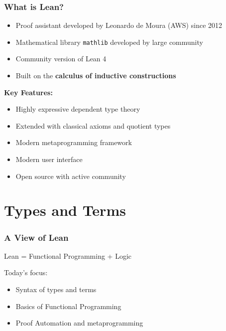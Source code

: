 \documentclass{beamer}
\begin{document}
\begin{frame}
  \frametitle{What is Lean?}
  
  \begin{itemize}
    \item Proof assistant developed by Leonardo de Moura (AWS) since 2012
    \item Mathematical library \texttt{mathlib} developed by large community
    \item Community version of Lean 4
    \item Built on the \textbf{calculus of inductive constructions}
  \end{itemize}
  
  \vspace{0.3cm}
  
  \textbf{Key Features:}
  \begin{itemize}
    \item Highly expressive dependent type theory
    \item Extended with classical axioms and quotient types
    \item Modern metaprogramming framework
    \item Modern user interface
    \item Open source with active community
  \end{itemize}
\end{frame}


\section{Types and Terms}

\begin{frame}
  \frametitle{A View of Lean}
  
  \begin{center}
    \Large
    Lean = Functional Programming + Logic
  \end{center}
  
  \vspace{0.5cm}
  
  Today's focus:
  \begin{itemize}
    \item Syntax of types and terms
    \item Basics of Functional Programming
    \item Proof Automation and metaprogramming
  \end{itemize}
\end{frame}
\end{document}
